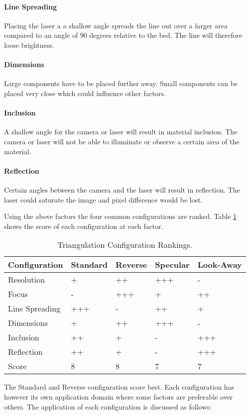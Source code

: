 \paragraph{Line Spreading} Placing the laser a a shallow angle spreads the line out over a larger area compared to an angle of $90$ degrees relative to the bed. The line will therefore loose brightness.

\paragraph{Dimensions} Large components have to be placed further away. Small components can be placed very close which could influence other factors.

\paragraph{Inclusion} A shallow angle for the camera or laser will result in material inclusion. The camera or laser will not be able to illuminate or observe a certain area of the material.

\paragraph{Reflection} Certain angles between the camera and the laser will result in reflection. The laser could saturate the image and pixel difference would be lost.

\skippar
Using the above factors the four common configurations are ranked. Table \ref{tab:triangulation_rank} shows the score of each configuration at each factor.
\begin{table}[ht]
\centering
\begin{tabular}{lllll} \hline 
Configuration & Standard & Reverse & Specular & Look-Away \\
\hline
Resolution & + & ++ & +++ & - \\
Focus & - & +++ & + & ++ \\
Line Spreading & +++ & - & ++ & + \\
Dimensions & + & ++ & +++ & - \\
Inclusion & ++ & + & - & +++ \\
Reflection & ++ & + & - & +++ \\
\hline
Score & 8 & 8 & 7 & 7 \\
\hline
\end{tabular}
\caption{Triangulation Configuration Rankings.}
\label{tab:triangulation_rank}
\end{table}
\skippar
The Standard and Reverse configuration score best. Each configuration has however its own application domain where some factors are preferable over others. The application of each configuration is discussed as follows:

